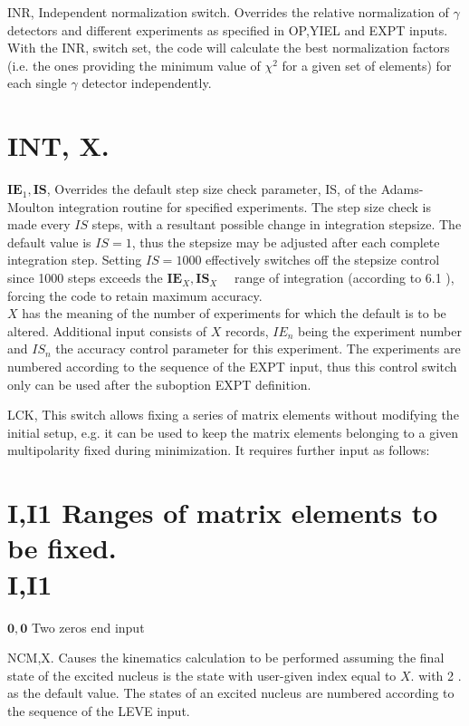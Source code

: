 \documentclass[10pt]{article}
\begin{document}
INR, Independent normalization switch. Overrides the relative normalization of $\gamma$ detectors and different experiments as specified in OP,YIEL and EXPT inputs. With the INR, switch set, the code will calculate the best normalization factors (i.e. the ones providing the minimum value of $\chi^{2}$ for a given set of elements) for each single $\gamma$ detector independently.

\section*{INT, X.}
$\mathbf{I E}_{1}, \mathbf{I S}$, Overrides the default step size check parameter, IS, of the Adams-Moulton integration routine for specified experiments. The step size check is made every $I S$ steps, with a resultant possible change in integration stepsize. The default value is $I S=1$, thus the stepsize may be adjusted after each complete integration step. Setting $I S=1000$ effectively switches off the stepsize control since 1000 steps exceeds the $\mathbf{I E}_{X}, \mathbf{I S}_{X} \quad$ range of integration (according to 6.1 ), forcing the code to retain maximum accuracy.\\
$X$ has the meaning of the number of experiments for which the default is to be altered. Additional input consists of $X$ records, $I E_{n}$ being the experiment number and $I S_{n}$ the accuracy control parameter for this experiment. The experiments are numbered according to the sequence of the EXPT input, thus this control switch only can be used after the suboption EXPT definition.

LCK, This switch allows fixing a series of matrix elements without modifying the initial setup, e.g. it can be used to keep the matrix elements belonging to a given multipolarity fixed during minimization. It requires further input as follows:

\section*{I,I1 Ranges of matrix elements to be fixed. \\
 I,I1}
$\mathbf{0 , 0}$ Two zeros end input

NCM,X. Causes the kinematics calculation to be performed assuming the final state of the excited nucleus is the state with user-given index equal to $X$. with 2 . as the default value. The states of an excited nucleus are numbered according to the sequence of the LEVE input.
\end{document}
